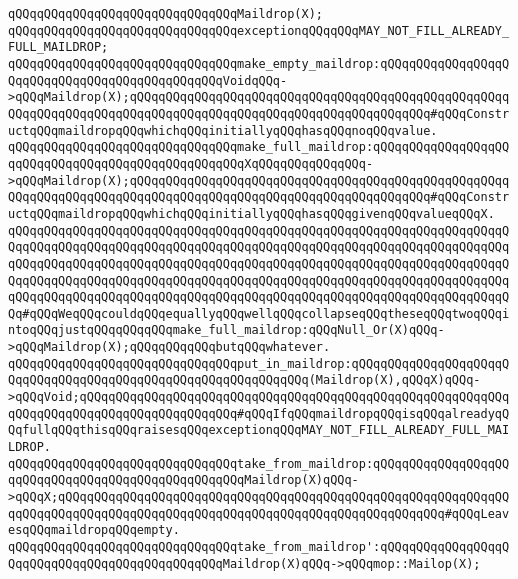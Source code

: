 \verb|qQQqqQQqqQQqqQQqqQQqqQQqqQQqqQQqMaildrop(X);|\newline
\newline
\verb|qQQqqQQqqQQqqQQqqQQqqQQqqQQqqQQqexceptionqQQqqQQqMAY_NOT_FILL_ALREADY_FULL_MAILDROP;|\newline
\newline
\verb|qQQqqQQqqQQqqQQqqQQqqQQqqQQqqQQqmake_empty_maildrop:qQQqqQQqqQQqqQQqqQQqqQQqqQQqqQQqqQQqqQQqqQQqqQQqVoidqQQq->qQQqMaildrop(X);qQQqqQQqqQQqqQQqqQQqqQQqqQQqqQQqqQQqqQQqqQQqqQQqqQQqqQQqqQQqqQQqqQQqqQQqqQQqqQQqqQQqqQQqqQQqqQQqqQQqqQQqqQQqqQQq#qQQqConstructqQQqmaildropqQQqwhichqQQqinitiallyqQQqhasqQQqnoqQQqvalue.|\newline
\verb|qQQqqQQqqQQqqQQqqQQqqQQqqQQqqQQqmake_full_maildrop:qQQqqQQqqQQqqQQqqQQqqQQqqQQqqQQqqQQqqQQqqQQqqQQqqQQqXqQQqqQQqqQQqqQQq->qQQqMaildrop(X);qQQqqQQqqQQqqQQqqQQqqQQqqQQqqQQqqQQqqQQqqQQqqQQqqQQqqQQqqQQqqQQqqQQqqQQqqQQqqQQqqQQqqQQqqQQqqQQqqQQqqQQqqQQqqQQq#qQQqConstructqQQqmaildropqQQqwhichqQQqinitiallyqQQqhasqQQqgivenqQQqvalueqQQqX.|\newline
\verb|qQQqqQQqqQQqqQQqqQQqqQQqqQQqqQQqqQQqqQQqqQQqqQQqqQQqqQQqqQQqqQQqqQQqqQQqqQQqqQQqqQQqqQQqqQQqqQQqqQQqqQQqqQQqqQQqqQQqqQQqqQQqqQQqqQQqqQQqqQQqqQQqqQQqqQQqqQQqqQQqqQQqqQQqqQQqqQQqqQQqqQQqqQQqqQQqqQQqqQQqqQQqqQQqqQQqqQQqqQQqqQQqqQQqqQQqqQQqqQQqqQQqqQQqqQQqqQQqqQQqqQQqqQQqqQQqqQQqqQQqqQQqqQQqqQQqqQQqqQQqqQQqqQQqqQQqqQQqqQQqqQQqqQQqqQQqqQQqqQQqqQQqqQQqqQQq#qQQqWeqQQqcouldqQQqequallyqQQqwellqQQqcollapseqQQqtheseqQQqtwoqQQqintoqQQqjustqQQqqQQqqQQqmake_full_maildrop:qQQqNull_Or(X)qQQq->qQQqMaildrop(X);qQQqqQQqqQQqbutqQQqwhatever.|\newline
\newline
\verb|qQQqqQQqqQQqqQQqqQQqqQQqqQQqqQQqput_in_maildrop:qQQqqQQqqQQqqQQqqQQqqQQqqQQqqQQqqQQqqQQqqQQqqQQqqQQqqQQqqQQqqQQq(Maildrop(X),qQQqX)qQQq->qQQqVoid;qQQqqQQqqQQqqQQqqQQqqQQqqQQqqQQqqQQqqQQqqQQqqQQqqQQqqQQqqQQqqQQqqQQqqQQqqQQqqQQqqQQqqQQqqQQq#qQQqIfqQQqmaildropqQQqisqQQqalreadyqQQqfullqQQqthisqQQqraisesqQQqexceptionqQQqMAY_NOT_FILL_ALREADY_FULL_MAILDROP.|\newline
\newline
\verb|qQQqqQQqqQQqqQQqqQQqqQQqqQQqqQQqtake_from_maildrop:qQQqqQQqqQQqqQQqqQQqqQQqqQQqqQQqqQQqqQQqqQQqqQQqqQQqMaildrop(X)qQQq->qQQqX;qQQqqQQqqQQqqQQqqQQqqQQqqQQqqQQqqQQqqQQqqQQqqQQqqQQqqQQqqQQqqQQqqQQqqQQqqQQqqQQqqQQqqQQqqQQqqQQqqQQqqQQqqQQqqQQqqQQqqQQqqQQq#qQQqLeavesqQQqmaildropqQQqempty.|\newline
\verb|qQQqqQQqqQQqqQQqqQQqqQQqqQQqqQQqtake_from_maildrop':qQQqqQQqqQQqqQQqqQQqqQQqqQQqqQQqqQQqqQQqqQQqqQQqMaildrop(X)qQQq->qQQqmop::Mailop(X);|\newline

